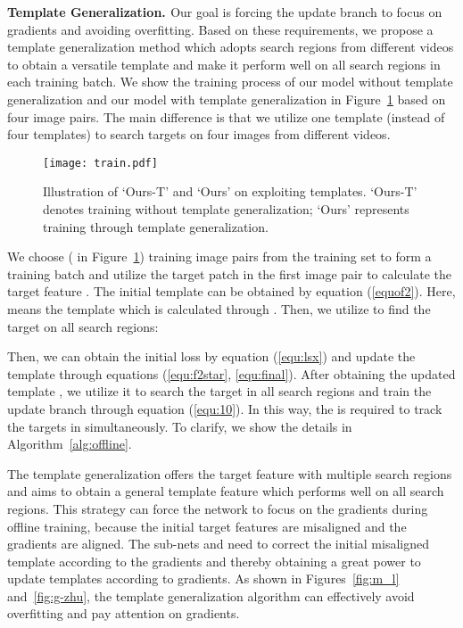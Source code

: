 \documentclass[10pt,twocolumn,letterpaper]{article}
\begin{document}
\vspace{4pt}
\noindent
{{\bf{Template Generalization. }}}
Our goal is forcing the update branch to focus on gradients and avoiding overfitting.
Based on these requirements, we propose a template generalization method which adopts search regions from different videos to obtain a versatile template and make it perform well on all search regions in each training batch.
We show the training process of our model without template generalization  and our model with template generalization  in Figure~\ref{fig:train} based on four image pairs. The main difference is that we utilize one template (instead of four templates) to search targets on four images from different videos.


\begin{figure}[t]
	\centering
	\texttt{[image: train.pdf]}\\
	\caption{ Illustration of `Ours-T' and `Ours' on exploiting templates. `Ours-T' denotes training without template generalization; `Ours' represents training through template generalization.} \label{fig:train}
\end{figure}

We choose  ( in Figure~\ref{fig:train}) training image pairs from the training set  to form a training batch and utilize the target patch  in the first image pair to calculate the target feature . The initial template  can be obtained by equation (\ref{equof2}). Here,  means the template which is calculated through .
Then, we utilize  to find the target on all search regions:

Then, we can obtain the initial loss by equation (\ref{equ:lsx}) and update the template  through equations (\ref{equ:f2star}, \ref{equ:final}). After obtaining the updated template , we utilize it to search the target in all search regions  and train the update branch through equation (\ref{equ:10}).
In this way, the  is required to track the targets in  simultaneously.
To clarify, we show the details in Algorithm~\ref{alg:offline}.


The template generalization offers the target feature with multiple search regions and aims to obtain a general template feature which performs well on all search regions. This strategy can force the network to focus on the gradients during offline training, because the initial target features are misaligned and the gradients are aligned. The sub-nets  and  need to correct the initial misaligned template according to the gradients and thereby obtaining a great power to update templates according to gradients.
As shown in Figures~\ref{fig:m_l} and~\ref{fig:g-zhu}, the template generalization algorithm can effectively avoid overfitting and pay attention on gradients.
\end{document}
